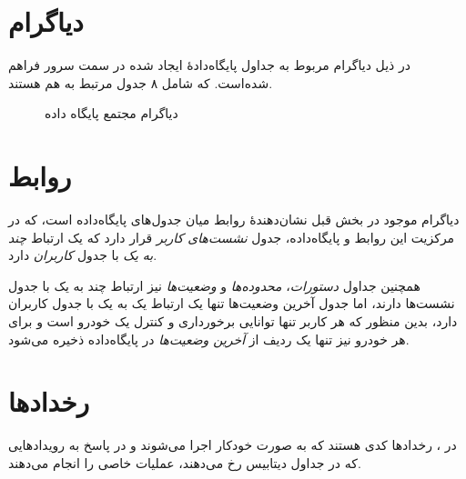 \section{دیاگرام}\label{sec2:chap3}
در ذیل دیاگرام مربوط به جداول پایگاه‌دادهٔ ایجاد شده در سمت سرور فراهم شده‌است.
که شامل ۸ جدول مرتبط به هم هستند.
\begin{figure}[!h]
	\centering
	\footnotesize
	\hspace*{1cm}
	\normalsize
	\label{fig2:sec3:chap3}
	\caption{دیاگرام مجتمع پایگاه داده}
\end{figure}


\section{روابط}\label{sec3:chap3}
دیاگرام موجود در بخش قبل نشان‌دهندهٔ روابط میان جدول‌های پایگاه‌داده است، که در مرکزیت این روابط و پایگاه‌داده، جدول
\emph{نشست‌های کاربر}
 قرار دارد که یک ارتباط
\textit{چند به یک}
  با جدول
\emph{کاربران}
 دارد.

همچنین جداول \emph{دستورات}، \emph{محدوده‌ها} و \emph{وضعیت‌ها} نیز ارتباط چند به یک با جدول نشست‌ها دارند، اما جدول آخرین وضعیت‌ها تنها یک ارتباط یک به یک با جدول کاربران دارد، بدین منظور که هر کاربر تنها توانایی برخورداری و کنترل یک خودرو است و برای هر خودرو نیز تنها یک ردیف از
\emph{آخرین وضعیت‌ها}
در پایگاه‌داده ذخیره می‌شود.

\section{رخداد‌ها}\label{sec4:chap3}
در ، رخدادها کدی هستند که به صورت خودکار اجرا می‌شوند و در پاسخ به رویدادهایی که در جداول دیتابیس رخ می‌دهند، عملیات خاصی را انجام می‌دهند.

